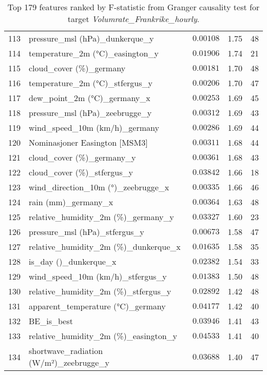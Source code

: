 \begin{table}[H]
\begin{tabular}{r l l l l}
        113 & pressure\_msl (hPa)\_dunkerque\_y & $0.00108$ & 1.75 & 48 \\
        114 & temperature\_2m (°C)\_easington\_y & $0.01906$ & 1.74 & 21 \\
        115 & cloud\_cover (\%)\_germany & $0.00181$ & 1.70 & 48 \\
        116 & temperature\_2m (°C)\_stfergus\_y & $0.00206$ & 1.70 & 47 \\
        117 & dew\_point\_2m (°C)\_germany\_x & $0.00253$ & 1.69 & 45 \\
        118 & pressure\_msl (hPa)\_zeebrugge\_y & $0.00312$ & 1.69 & 43 \\
        119 & wind\_speed\_10m (km/h)\_germany & $0.00286$ & 1.69 & 44 \\
        120 & Nominasjoner Easington [MSM3] & $0.00311$ & 1.68 & 44 \\
        121 & cloud\_cover (\%)\_germany\_y & $0.00361$ & 1.68 & 43 \\
        122 & cloud\_cover (\%)\_stfergus\_y & $0.03842$ & 1.66 & 18 \\
        123 & wind\_direction\_10m (°)\_zeebrugge\_x & $0.00335$ & 1.66 & 46 \\
        124 & rain (mm)\_germany\_x & $0.00364$ & 1.63 & 48 \\
        125 & relative\_humidity\_2m (\%)\_germany\_y & $0.03327$ & 1.60 & 23 \\
        126 & pressure\_msl (hPa)\_stfergus\_y & $0.00673$ & 1.58 & 47 \\
        127 & relative\_humidity\_2m (\%)\_dunkerque\_x & $0.01635$ & 1.58 & 35 \\
        128 & is\_day ()\_dunkerque\_x & $0.02382$ & 1.54 & 33 \\
        129 & wind\_speed\_10m (km/h)\_stfergus\_y & $0.01383$ & 1.50 & 48 \\
        130 & relative\_humidity\_2m (\%)\_stfergus\_y & $0.02892$ & 1.42 & 48 \\
        131 & apparent\_temperature (°C)\_germany & $0.04177$ & 1.42 & 40 \\
        132 & BE\_is\_best & $0.03946$ & 1.41 & 43 \\
        133 & relative\_humidity\_2m (\%)\_easington\_y & $0.04533$ & 1.41 & 40 \\
        134 & shortwave\_radiation (W/m²)\_zeebrugge\_y & $0.03688$ & 1.40 & 47 \\
        \hline
    \end{tabular}
    \caption{Top 179 features ranked by F-statistic from Granger causality test for target \textit{Volumrate\_Frankrike\_hourly}.}
    \label{tab:granger_Frankrike_fstat}
\end{table}